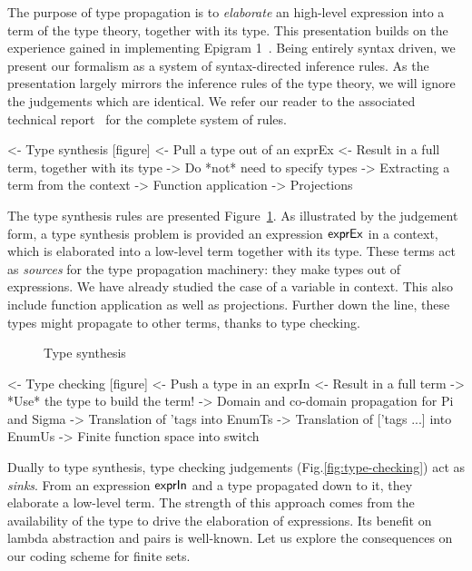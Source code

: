 
The purpose of type propagation is to \emph{elaborate} an high-level
expression into a term of the type theory, together with its
type. This presentation builds on the experience gained in
implementing Epigram 1~\cite{mcbride:view-from-the-left}. Being
entirely syntax driven, we present our formalism as a system of
syntax-directed inference rules. As the presentation largely mirrors
the inference rules of the type theory, we will ignore the judgements
which are identical. We refer our reader to the associated technical
report~\cite{chapman:desc-tech-report} for the complete system of
rules.

\begin{wstructure}
<- Type synthesis [figure]
    <- Pull a type out of an exprEx
    <- Result in a full term, together with its type
    -> Do *not* need to specify types
        -> Extracting a term from the context
        -> Function application
        -> Projections
\end{wstructure}

The type synthesis rules are presented
Figure~\ref{fig:type-synthesis}. As illustrated by the judgement form,
a type synthesis problem is provided an expression $\textsf{exprEx}$ in a
context, which is elaborated into a low-level term together with its
type. These terms act as \emph{sources} for the type propagation
machinery: they make types out of expressions. We have already studied
the case of a variable in context. This also include function
application as well as projections. Further down the line, these types
might propagate to other terms, thanks to type checking.

\begin{figure}

\caption{Type synthesis}
\label{fig:type-synthesis}
\end{figure}



\begin{wstructure}
<- Type checking [figure]
    <- Push a type in an exprIn
    <- Result in a full term
    -> *Use* the type to build the term!
        -> Domain and co-domain propagation for Pi and Sigma
        -> Translation of 'tags into EnumTs
        -> Translation of ['tags ...] into EnumUs
        -> Finite function space into switch
\end{wstructure}

Dually to type synthesis, type checking judgements
(Fig.\ref{fig:type-checking}) act as \emph{sinks}. From an expression
$\textsf{exprIn}$ and a type propagated down to it, they elaborate a low-level
term. The strength of this approach comes from the availability of the
type to drive the elaboration of expressions. Its benefit on lambda
abstraction and pairs is well-known. Let us explore the consequences
on our coding scheme for finite sets.

